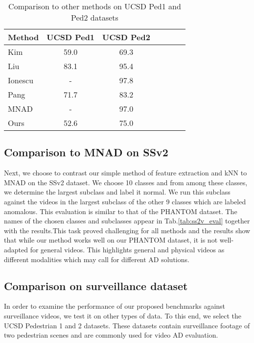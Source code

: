 \documentclass{article}
\begin{document}
\begin{table}[t!]
  \centering

    \begin{tabular}{lcccccc}
    \toprule      
	Method	&	UCSD Ped1	&	UCSD Ped2	\\
\midrule						

	Kim\cite{kim2009observe}	&	59.0	&	69.3	\\
	Liu\cite{liu2018future}	&	83.1	&	95.4	\\

	Ionescu\cite{ionescu2019object}	&	-	&	97.8	\\
			Pang\cite{pang2020self}	&	71.7	&	83.2	\\
		MNAD\cite{park2020learning}	&	-	&	97.0	\\
	Ours	&	52.6	&	75.0	\\
	 \bottomrule
    \end{tabular}
    \caption{Comparison to other methods on UCSD Ped1 and Ped2 datasets}
      \label{tab:ucsd_eval}

\end{table}

\subsection{Comparison to MNAD on SSv2}
\label{sec:exp_general}

Next, we choose to contrast our simple method of feature extraction and kNN to MNAD on the SSv2 dataset. We choose 10 classes and from among these classes, we determine the largest subclass and label it normal. We run this subclass against the videos in the largest subclass of the other 9 classes which are labeled anomalous. This evaluation is similar to that of the PHANTOM dataset. The names of the chosen classes and subclasses appear in Tab.\ref{tab:ss2v_eval} together with the results.This task proved challenging for all methods and the results show that while our method works well on our PHANTOM dataset, it is not well-adapted for general videos. This highlights general and physical videos as different modalities which may call for different AD solutions.


\subsection{Comparison on surveillance dataset}

In order to examine the performance of our proposed benchmarks against surveillance videos, we test it on other types of data. To this end, we select the UCSD Pedestrian 1 and 2 datasets. These datasets contain surveillance footage of two pedestrian scenes and are commonly used for video AD evaluation.
\end{document}
